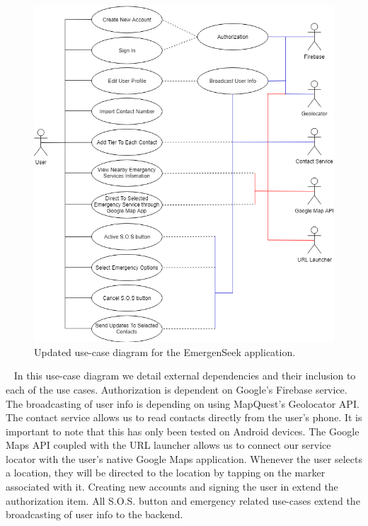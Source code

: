 \documentclass[10pt, a4paper]{article}
\begin{document}
\begin{figure}[H]
\begin{center}
\centerline{
	\includegraphics[scale=.6]{final-diagrams/Revised_Use_Case_Diagram.png}
}
\caption{Updated use-case diagram for the EmergenSeek application.}
\end{center}	
\end{figure}
\par ~ In this use-case diagram we detail external dependencies and their inclusion to each of the use cases. Authorization is dependent on Google's Firebase service. The broadcasting of user info is depending on using MapQuest's Geolocator API. The contact service allows us to read contacts directly from the user's phone. It is important to note that this has only been tested on Android devices. The Google Maps API coupled with the URL launcher allows us to connect our service locator with the user's native Google Maps application. Whenever the user selects a location, they will be directed to the location by tapping on the marker associated with it. Creating new accounts and signing the user in extend the authorization item. All S.O.S. button and emergency related use-cases extend the broadcasting of user info to the backend. 
\end{document}
